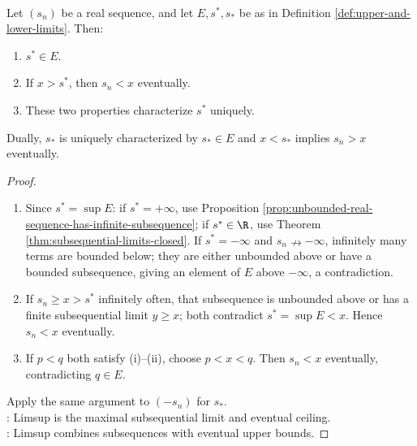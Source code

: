 \begin{theorem} \label{thm:limsup-characterization} \\
Let $(s_n)$ be a real sequence, and let $E,s^*,s_*$ be as in Definition \ref{def:upper-and-lower-limits}. Then:
\begin{enumerate}[label=(\roman*)]
\setlength{\itemsep}{0pt}
\item $s^*\in E$.
\item If $x>s^*$, then $s_n<x$ eventually.
\item These two properties characterize $s^*$ uniquely.
\end{enumerate}
Dually, $s_*$ is uniquely characterized by $s_*\in E$ and $x<s_*$ implies $s_n>x$ eventually.
\begin{proof}
\begin{enumerate}[label=(\roman*)]
\setlength{\itemsep}{0pt}
\item Since $s^*=\sup E$: if $s^*=+\infty$, use Proposition \ref{prop:unbounded-real-sequence-has-infinite-subsequence}; if $s^*\in\R$, use Theorem \ref{thm:subsequential-limits-closed}. If $s^*=-\infty$ and $s_n\nrightarrow-\infty$, infinitely many terms are bounded below; they are either unbounded above or have a bounded subsequence, giving an element of $E$ above $-\infty$, a contradiction.
\item If $s_n\geq x>s^*$ infinitely often, that subsequence is unbounded above or has a finite subsequential limit $y\geq x$; both contradict $s^*=\sup E<x$. Hence $s_n<x$ eventually.
\item If $p<q$ both satisfy (i)--(ii), choose $p<x<q$. Then $s_n<x$ eventually, contradicting $q\in E$.
\end{enumerate}
Apply the same argument to $(-s_n)$ for $s_*$.\\
: Limsup is the maximal subsequential limit and eventual ceiling.\\
: Limsup combines subsequences with eventual upper bounds.
\end{proof}
\end{theorem}

